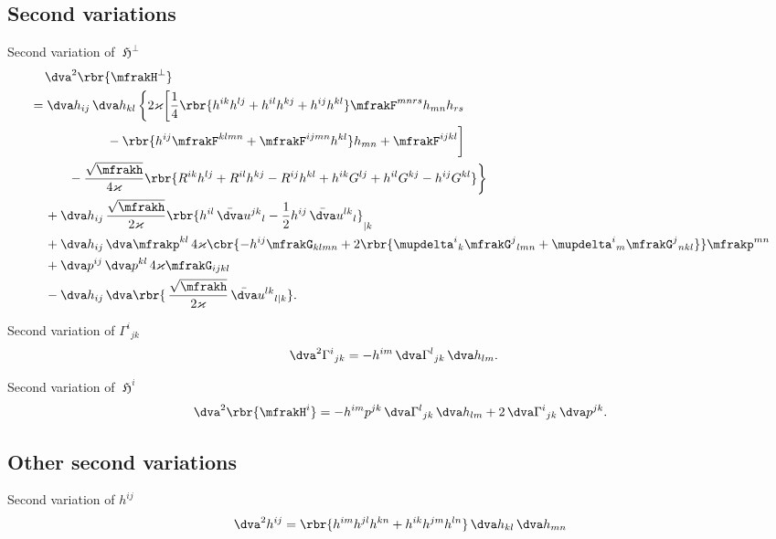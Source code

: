 \documentclass[a4paper,11pt]{article}
\begin{document}
\subsection*{Second variations}

Second variation of $\mfrakH^\perp$
\begin{align}
&\quad\,
\dva^2\rbr{\mfrakH^\perp}
\nonumber \\
&= \dva h_{ij}\,\dva h_{kl}\,\bigg\{ 2\varkappa\bigg[
\frac{1}{4}\rbr{h^{ik}h^{lj}+h^{il}h^{kj}+h^{ij}h^{kl}} \mfrakF^{mnrs} 
h_{mn} h_{rs}
\nonumber \\
&\qquad\qquad\qquad
-\rbr{h^{ij}\mfrakF^{klmn}+\mfrakF^{ijmn}h^{kl}}h_{mn}
+\mfrakF^{ijkl} \bigg]
\nonumber \\
&\qquad\quad
-\frac{\sqrt{\mfrakh}}{4\varkappa}\rbr{
R^{ik}h^{lj}+R^{il}h^{kj}-R^{ij}h^{kl}+h^{ik}G^{lj}+h^{il}G^{kj}-h^{ij}G^{kl}}
\bigg\}
\nonumber \\
&\quad\,
+\dva h_{ij}\,\frac{\sqrt{\mfrakh}}{2\varkappa}
\rbr{h^{il}\,\bar{\dva}u^{jk}{}_{l}
- \frac{1}{2}h^{ij}\,\bar{\dva}u^{lk}{}_{l}}_{|k} 
\nonumber \\
&\quad\,
+\dva h_{ij}\,\dva \mfrakp^{kl}\,4\varkappa
\cbr{-h^{ij}\mfrakG_{klmn}+2\rbr{\mupdelta^i{}_k\mfrakG^{j}{}_{lmn} 
+\mupdelta^i{}_m\mfrakG^{j}{}_{nkl}} } \mfrakp^{mn}
\nonumber \\
&\quad\,
+\dva p^{ij}\,\dva p^{kl}\,4\varkappa \mfrakG_{ijkl}
\nonumber \\
&\quad\,
-\dva h_{ij}\,
\dva\rbr{\,\frac{\sqrt{\mfrakh}}{2\varkappa}\,\bar{\dva}u^{lk}{}_{l|k}}.
\end{align}

Second variation of $\Gamma^i{}_{jk}$
\begin{align}
\dva^2 \Gamma^i{}_{jk} &=
- h^{im} \,\dva\Gamma^{l}{}_{jk} \,\dva h_{lm}.
\end{align}

Second variation of $\mfrakH^i$
\begin{align}
\dva^2\rbr{\mfrakH^i} = -h^{im}p^{jk}
\,\dva\Gamma^{l}{}_{jk}\,\dva h_{lm} + 2\,\dva\Gamma^{i}{}_{jk}\,\dva p^{jk}.
\end{align}


\subsection*{Other second variations}

Second variation of $h^{ij}$
\begin{align}
\dva^2 h^{ij} = \rbr{h^{im}h^{jl}h^{kn}+h^{ik}h^{jm}h^{ln}}
\,\dva h_{kl}\,\dva h_{mn}
\end{align}
\end{document}
